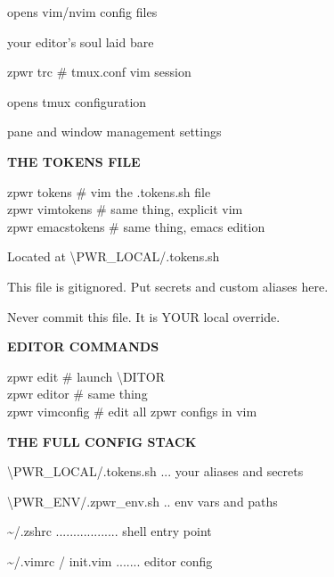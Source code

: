 \documentclass[11pt,a4paper,twoside]{book}
\begin{document}
opens vim/nvim config files

your editor's soul laid bare

\begin{codebox}
zpwr trc    \# tmux.conf vim session\\
\end{codebox}

opens tmux configuration

pane and window management settings


\vspace{12pt}
{\bfseries\color{neonyellow} THE TOKENS FILE}\vspace{4pt}

\begin{codebox}
zpwr tokens       \# vim the .tokens.sh file\\
zpwr vimtokens    \# same thing, explicit vim\\
zpwr emacstokens  \# same thing, emacs edition\\
\end{codebox}

Located at \textbackslash{}PWR\_LOCAL/.tokens.sh

This file is gitignored. Put secrets and custom aliases here.

Never commit this file. It is YOUR local override.


\vspace{12pt}
{\bfseries\color{neonyellow} EDITOR COMMANDS}\vspace{4pt}

\begin{codebox}
zpwr edit      \# launch \textbackslash{}DITOR\\
zpwr editor    \# same thing\\
zpwr vimconfig \# edit all zpwr configs in vim\\
\end{codebox}


\vspace{12pt}
{\bfseries\color{neonyellow} THE FULL CONFIG STACK}\vspace{4pt}

\textbackslash{}PWR\_LOCAL/.tokens.sh ... your aliases and secrets

\textbackslash{}PWR\_ENV/.zpwr\_env.sh .. env vars and paths

\textasciitilde{}/.zshrc .................. shell entry point

\textasciitilde{}/.vimrc / init.vim ....... editor config
\end{document}
